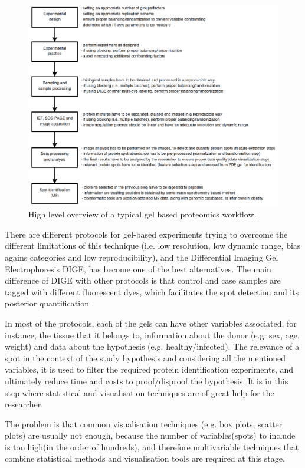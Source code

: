 \begin{figure}  
\centering
\includegraphics[width=\textwidth]{figures/gel-based.png}
\caption[High level overview of a typical gel based proteomics workflow.]{High level overview of a typical gel based proteomics workflow.
\label{fig:gelflow}}
\end{figure}

There are different protocols for gel-based experiments trying to overcome the different limitations of this technique (i.e. low resolution, low dynamic range, bias agains categories and low reproducibility), and the Differential Imaging Gel Electrophoresis DIGE, has become one of the best alternatives. The main difference of DIGE with other protocols is that control and case samples are tagged with different fluorescent dyes, which facilitates the spot detection and its posterior quantification \cite{PAN2008}.

In most of the protocols, each of the gels can have other variables associated, for instance, the tissue that it belongs to, information about the donor (e.g. sex, age, weight) and data about the hypothesis (e.g. healthy/infected). The relevance of a spot in the context of the study hypothesis and considering all the mentioned variables, it is used to filter the required protein identification experiments, and ultimately reduce time and costs to proof/disproof the hypothesis. It is in this step where statistical and visualisation techniques are of great help for the researcher.

The problem is that common visualisation techniques (e.g. box plots, scatter plots) are usually not enough, because the number of variables(spots) to include is too high(in the order of hundreds), and therefore multivariable techniques that combine statistical methods and visualisation tools are required at this stage.

